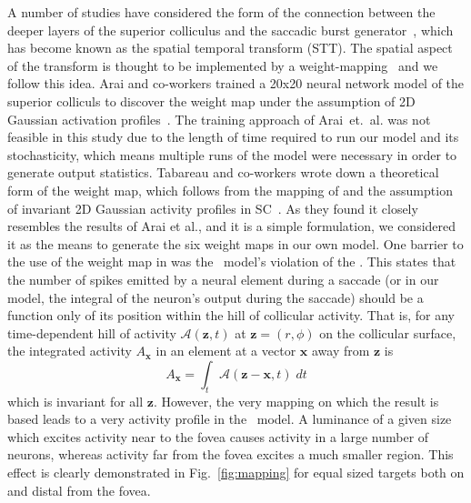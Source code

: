 \documentclass{frontiersSCNS}
\begin{document}
A number of studies have considered the form of the connection between
the deeper layers of the superior colliculus and the saccadic burst
generator~\cite{van_gisbergen_experimental_1985,ottes_visuomotor_1986,waitzman_superior_1991,groh_converting_2001,arai_two-dimensional_1994,goossens_dynamic_2006,tabareau_geometry_2007,van_opstal_linear_2008,goossens_optimal_2012},
which has become known as the spatial temporal transform (STT).  The
spatial aspect of the transform is thought to be implemented by a
weight-mapping~\cite{tabareau_geometry_2007,arai_two-dimensional_1994} and we
follow this idea.
Arai and co-workers trained a 20x20 neural network model of the
superior colliculs to discover the weight map under the assumption of
2D Gaussian activation profiles~\cite{arai_two-dimensional_1994}.
%
The training approach of Arai~et.~al. was not feasible in this study
due to the length of time required to run our model and its
stochasticity, which means multiple runs of the model were necessary
in order to generate output statistics.
%
Tabareau and co-workers wrote down a theoretical form of the weight
map, which follows from the mapping of \cite{ottes_visuomotor_1986}
and the assumption of invariant 2D Gaussian activity profiles in
SC~\cite{tabareau_geometry_2007}. As they found it closely resembles the
results of Arai et al., and it is a simple formulation, we considered
it as the means to generate the six weight maps in our own model.
%
One barrier to the use of the weight map
in \cite{tabareau_geometry_2007} was the \ccg~model's violation of the
. This states that the number of spikes
emitted by a neural element during a saccade (or in our model, the
integral of the neuron's output during the saccade) should be a
function only of its position within the hill of collicular
activity. That is, for any time-dependent hill of activity
$\mathcal{A}(\mathbf{z},t)$ at $\mathbf{z} = (r,\phi)$ on the collicular
surface, the integrated activity  $A_{\mathbf{x}}$ in an element at a
vector $\mathbf{x}$ away from $\mathbf{z}$ is
\begin{equation}
A_{\mathbf{x}} = \int_t \mathcal{A}(\mathbf{z}-\mathbf{x}, t)\;dt
\end{equation}
which is invariant for all $\mathbf{z}$. However, the very mapping on
which the \cite{tabareau_geometry_2007} result is based leads to a
very  activity profile in the \ccg~model. A luminance of
a given size which excites activity near to the fovea causes activity
in a large number of neurons, whereas activity far from the fovea
excites a much smaller region. This effect is clearly demonstrated in
Fig.~\ref{fig:mapping} for equal sized targets both on and distal from
the fovea.
\end{document}
